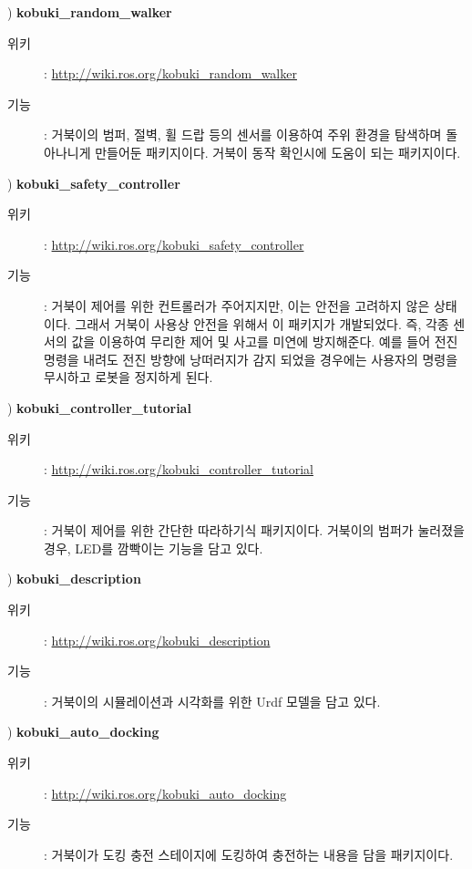 \vspace{\baselineskip}
\noindent{}
\thenum) \textbf{kobuki\_random\_walker}
\begin{description}
\item[위키]: \url{http://wiki.ros.org/kobuki_random_walker}
\item[기능]: 거북이의 범퍼, 절벽, 휠 드랍 등의 센서를 이용하여 주위 환경을 탐색하며 돌아나니게 만들어둔 패키지이다. 거북이 동작 확인시에 도움이 되는 패키지이다.
\end{description}

\vspace{\baselineskip}
\noindent{}
\thenum) \textbf{kobuki\_safety\_controller}
\begin{description}
\item[위키]: \url{http://wiki.ros.org/kobuki_safety_controller}
\item[기능]: 거북이 제어를 위한 컨트롤러가 주어지지만, 이는 안전을 고려하지 않은 상태이다. 그래서 거북이 사용상 안전을 위해서 이 패키지가 개발되었다. 즉, 각종 센서의 값을 이용하여 무리한 제어 및 사고를 미연에 방지해준다. 예를 들어 전진 명령을 내려도 전진 방향에 낭떠러지가 감지 되었을 경우에는 사용자의 명령을 무시하고 로봇을 정지하게 된다.
\end{description}

\vspace{\baselineskip}
\noindent{}
\thenum) \textbf{kobuki\_controller\_tutorial}
\begin{description}
\item[위키]: \url{http://wiki.ros.org/kobuki_controller_tutorial}
\item[기능]: 거북이 제어를 위한 간단한 따라하기식 패키지이다. 거북이의 범퍼가 눌러졌을 경우, LED를 깜빡이는 기능을 담고 있다.
\end{description}

\vspace{\baselineskip}
\noindent{}
\thenum) \textbf{kobuki\_description}
\begin{description}
\item[위키]: \url{http://wiki.ros.org/kobuki_description}
\item[기능]: 거북이의 시뮬레이션과 시각화를 위한 Urdf 모델을 담고 있다.
\end{description}

\vspace{\baselineskip}
\noindent{}
\thenum) \textbf{kobuki\_auto\_docking}
\begin{description}
\item[위키]: \url{http://wiki.ros.org/kobuki_auto_docking}
\item[기능]: 거북이가 도킹 충전 스테이지에 도킹하여 충전하는 내용을 담을 패키지이다.
\end{description}

